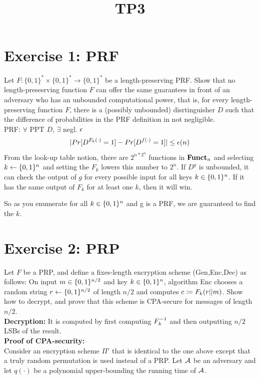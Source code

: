 \documentclass[12pt]{article}
\title{TP3}
\begin{document}
\maketitle
\tableofcontents
\newpage

\section{Exercise 1: PRF}
Let $F: \{0,1\}^* \times \{0,1\}^* \rightarrow \{0,1\}^*$ be a length-preserving PRF. Show that no length-presesrving function $F$ can offer the same guarantees in front of an adversary who has an unbounded computational power, that is, for every length-preserving function $F$, there is a (possibly unbounded) disrtinguisher $D$ such that the difference of probabilities in the PRF definition in not negligible.\\

PRF: $\forall$ PPT $D$, $\exists$ negl. $\epsilon$
\begin{equation*}
|Pr[D^{F_k(\cdot)}=1]-Pr[D^{f(\cdot)}=1]| \le \epsilon(n)
\end{equation*}
From the look-up table notion, there are $2^{n*2^n}$ functions in $\textbf{Funct}_n$ and selecting $k\leftarrow \{0,1\}^n$ and setting the $F_k$ lowers this number to $2^n$. If $D^g$ is unbounded, it can check the output of $g$ for every possible input for all keys $k \in \{0,1\}^n$. If it has the same output of $F_k$ for at least one $k$, then it will win.

So as you enumerate for all $k \in \{0,1\}^n$ and g is a PRF, we are guaranteed to find the $k$.


\section{Exercise 2: PRP}
Let $F$ be a PRP, and define a fixes-length encryption scheme (Gen,Enc,Dec) as follows: On input $m \in \{0,1\}^{n/2}$ and key $k \in \{0,1\}^n$, algorithm Enc chooses a random string $r \leftarrow \{0,1\}^{n/2}$ of length $n/2$ and computes $c\coloneqq F_k(r||m)$. Show how to decrypt, and prove that this scheme is CPA-secure for messages of length $n/2$.\\

\textbf{Decryption:} It is computed by first computing $F_k^{-1}$ and then outputting $n/2$ LSBs of the result.\\

\textbf{Proof of CPA-security:}\\
Consider an encryption scheme $\Pi'$ that is identical to the one above except that a truly random permutation is used instead of a PRP. Let $\mathcal{A}$ be an adversary and let $q(\cdot)$ be a polynomial upper-bounding the running time of $\mathcal{A}$.
\end{document}
